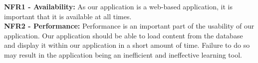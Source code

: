 \documentclass{l3proj}
\begin{document}
\textbf{ NFR1 - Availability:}
As our application is a web-based application, it is important that it is available at all times. \\

\textbf{NFR2 - Performance:}
Performance is an important part of the usability of our application. Our application should be able to load content from the database and display it within our application in a short amount of time. Failure to do so may result in the application being an inefficient and ineffective learning tool.\\
\end{document}
